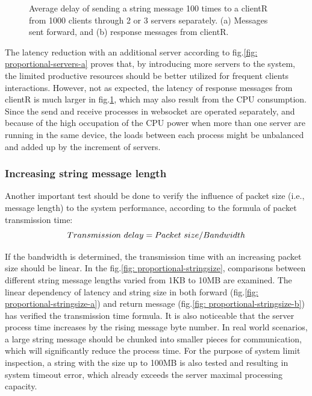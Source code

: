 \begin{figure}[htb]
\begin{subfigure}[b]{0.49\textwidth}
        \caption{} \label{fig: proportional-servers-b}
        \end{subfigure}
    \caption{Average delay of sending a string message 100 times 
    to a clientR from 1000 clients through 2 or 3 servers separately. (a) Messages sent forward, 
    and (b) response messages from clientR. 
    \label{fig: proportional-servers}}
\end{figure}

The latency reduction with an additional server according to 
fig.\ref{fig: proportional-servers-a} proves that, by introducing more servers 
to the system, the limited productive resources should be better utilized 
for frequent clients interactions. However, not as expected, the latency of 
response messages from clientR is much larger in fig.\ref{fig: proportional-servers-b},
which may also result from the CPU consumption. Since the send and receive 
processes in websocket are operated separately, and because of the high 
occupation of the CPU power when more than one server are running in the same 
device, the loads between each process might be unbalanced and added up by the 
increment of servers. 


\subsubsection{Increasing string message length}
Another important test should be done to verify the influence of packet size (i.e., 
message length) to the system performance, according to the formula of packet 
transmission time: 
\begin{equation}
    Transmission $ $ delay = Packet $ $ size/Bandwidth
\end{equation}

If the bandwidth is determined, the transmission time with an increasing packet 
size should be linear. In the fig.\ref{fig: proportional-stringsize}, comparisons 
between different string message lengths varied from 1KB to 10MB are examined. 
The linear dependency of latency and string size in both forward 
(fig.\ref{fig: proportional-stringsize-a}) and return message (fig.\ref{fig: proportional-stringsize-b}) 
has verified the transmission time formula. It is also noticeable that the server 
process time increases by the rising message byte number. In real world scenarios, 
a large string message should be chunked into smaller pieces for communication, 
which will significantly reduce the process time. For the purpose of system limit 
inspection, a string with the size up to 100MB is also tested and resulting in 
system timeout error, which already exceeds the server maximal 
processing capacity. 


